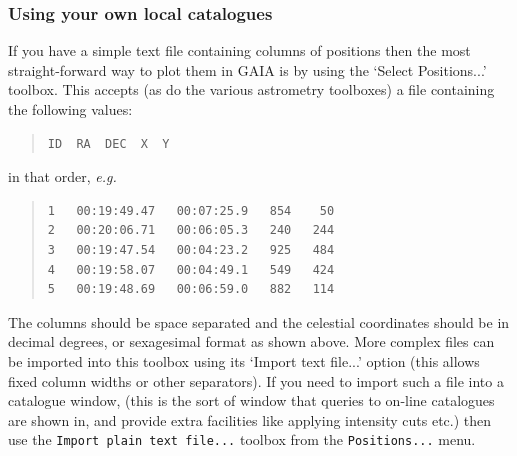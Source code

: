 \documentclass[twoside,11pt]{article}
\renewcommand{\_}{\texttt{\symbol{95}}}
\newcommand{\mytt}[1]{{\texttt{#1}}}
\begin{document}
\subsubsection{Using your own local catalogues}
If you have a simple text file containing columns of positions then
the most straight-forward way to plot them in GAIA is by using the
`Select Positions...' toolbox. This accepts (as do the various
astrometry toolboxes) a file containing the following values:
\begin{quote}
\begin{verbatim}
ID  RA  DEC  X  Y
\end{verbatim}
\end{quote}
in that order, \textit{e.g.}
\begin{quote}
\begin{verbatim}
1   00:19:49.47   00:07:25.9   854    50
2   00:20:06.71   00:06:05.3   240   244
3   00:19:47.54   00:04:23.2   925   484
4   00:19:58.07   00:04:49.1   549   424
5   00:19:48.69   00:06:59.0   882   114
\end{verbatim}
\end{quote}
The columns should be space separated and the celestial coordinates
should be in decimal degrees, or sexagesimal format as shown above. More
complex files can be imported into this toolbox using its `Import text
file...'  option (this allows fixed column widths or other
separators). If you need to import such a file into a catalogue window,
(this is the sort of window that queries to on-line catalogues are shown
in, and provide extra facilities like applying intensity cuts etc.) then
use the
\mytt{Import plain text file...} toolbox from the \mytt{Positions...} menu.
\end{document}
